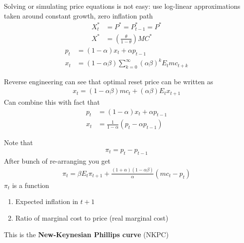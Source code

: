 \documentclass{beamer}
\begin{document}
\begin{frame}
  Solving or simulating price equations is not easy: use log-linear approximations taken around constant growth, zero inflation path
  \begin{align}
    X_t^* &= P^*=P^*_{t-1}=P^*\\
  X^* &= \left(\frac{\theta}{1-\theta}\right)MC^*    
  \end{align}
\begin{align}
  p_t &= (1-\alpha)x_t + \alpha p_{t-1}\\
  x_t &= (1-\alpha \beta) \sum_{k=0}^{\infty} (\alpha \beta)^k E_tmc_{t+k}
\end{align} 
\end{frame}

\begin{frame}
  Reverse engineering can see that optimal reset price can be written as
  \begin{align}
  x_t=(1-\alpha \beta) mc_t + (\alpha \beta) E_t x_{t+1}
 \end{align}
 Can combine this with fact that 
\begin{align}
  p_t &= (1-\alpha)x_t+\alpha p_{t-1}\\
  x_t &= \frac{1}{1-\alpha}(p_t-\alpha p_{t-1})  
\end{align}
\end{frame}

\begin{frame}
  Note that 
  \begin{align}
    \pi_t=p_t-p_{t-1}
  \end{align}
  After bunch of re-arranging you get  
\begin{align}
  \pi_t= \beta E_t \pi_{t+1} + \frac{(1+\alpha)(1-\alpha \beta)}{\alpha}(mc_t - p_t)
\end{align}
$\pi_t$ is a function 
\begin{enumerate}
  \item Expected inflation in $t+1$
  \item Ratio of marginal cost to price (real marginal cost)
\end{enumerate}
  This is the \textbf{New-Keynesian Phillips curve} (NKPC)
\end{frame}
\end{document}
